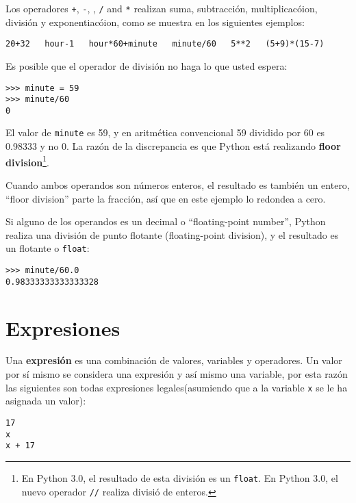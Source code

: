 Los operadores {\tt +}, {\tt -}, {\tt *}, {\tt /} and {\tt **}
realizan suma, subtracci\'on, multiplicac\'oion, divisi\'on y
exponentiac\'oion, como se muestra en los siguientes ejemplos:

\beforeverb
\begin{verbatim}
20+32   hour-1   hour*60+minute   minute/60   5**2   (5+9)*(15-7)
\end{verbatim}
\afterverb
%
Es posible que el operador de divisi\'on no haga lo que usted espera:

\beforeverb
\begin{verbatim}
>>> minute = 59
>>> minute/60
0
\end{verbatim}
\afterverb
%
El valor de {\tt minute} es 59, y en aritm\'etica convencional 59
dividido por 60 es 0.98333 y no 0.  La raz\'on de la discrepancia es que Python est\'a realizando {\bf floor division}\footnote{En Python 3.0,
el resultado de esta divisi\'on es un {\tt float}.  
En Python 3.0, el nuevo operador
{\tt //} realiza divisi\'o de enteros.}.


Cuando ambos operandos son n\'umeros enteros, el resultado es tambi\'en un entero, ``floor division'' parte la fracci\'on, as\'i que en este ejemplo lo redondea a cero.

Si alguno de los operandos es un decimal o ``floating-point number'', Python realiza una 
divisi\'on de punto flotante (floating-point division), y el resultado es un flotante o {\tt float}:

\beforeverb
\begin{verbatim}
>>> minute/60.0
0.98333333333333328
\end{verbatim}
\afterverb


\section{Expresiones}


Una {\bf expresi\'on} es una combinaci\'on de valores, variables y operadores.
Un valor por s\'i mismo se considera una expresi\'on y as\'i mismo una variable, por esta raz\'on las siguientes son todas expresiones legales(asumiendo que a la variable {\tt x} se le ha asignada un valor):



\beforeverb
\begin{verbatim}
17
x
x + 17
\end{verbatim}
\afterverb
%

